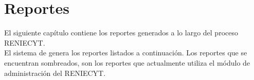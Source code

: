 \chapter{Reportes}
\label{appendix:Reportes}

El siguiente capítulo contiene los reportes generados a lo largo del proceso RENIECYT.\\


\noindent El sistema de  genera los reportes listados a continuación. Los reportes que se encuentran sombreados, son los reportes que actualmente utiliza el módulo de administración del RENIECYT.\\

